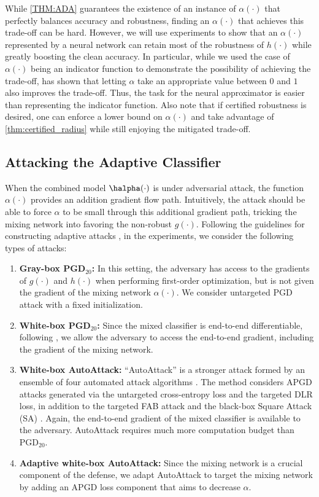 \documentclass[11pt, letterpaper]{article}
\theoremstyle{plain}
\theoremstyle{definition}
\begin{document}
While \cref{THM:ADA} guarantees the existence of an instance of $\alpha (\cdot)$ that perfectly balances accuracy and robustness, finding an $\alpha (\cdot)$ that achieves this trade-off can be hard. However, we will use experiments to show that an $\alpha (\cdot)$ represented by a neural network can retain most of the robustness of $h (\cdot)$ while greatly boosting the clean accuracy. In particular, while we used the case of $\alpha (\cdot)$ being an indicator function to demonstrate the possibility of achieving the trade-off,  has shown that letting $\alpha$ take an appropriate value between $0$ and $1$ also improves the trade-off. Thus, the task for the neural approximator is easier than representing the indicator function. Also note that if certified robustness is desired, one can enforce a lower bound on $\alpha (\cdot)$ and take advantage of \cref{thm:certified_radius} while still enjoying the mitigated trade-off.


\subsection{Attacking the Adaptive Classifier} \label{sec:adaptive_attack}

When the combined model $\halpha (\cdot)$ is under adversarial attack, the function $\alpha (\cdot)$ provides an addition gradient flow path. Intuitively, the attack should be able to force $\alpha$ to be small through this additional gradient path, tricking the mixing network into favoring the non-robust $g (\cdot)$. Following the guidelines for constructing adaptive attacks \citep{Tramer20}, in the experiments, we consider the following types of attacks:
\begin{enumerate}[label=\textbf{\Alph*}, leftmargin=7.5mm]
\setlength\itemsep{1pt}
	\item \textbf{Gray-box PGD$_{20}$:} In this setting, the adversary has access to the gradients of $g (\cdot)$ and $h (\cdot)$ when performing first-order optimization, but is not given the gradient of the mixing network $\alpha (\cdot)$. We consider untargeted PGD attack with a fixed initialization.
	\item \textbf{White-box PGD$_{20}$:} Since the mixed classifier is end-to-end differentiable, following \citep{Tramer20}, we allow the adversary to access the end-to-end gradient, including the gradient of the mixing network.
	\item \textbf{White-box AutoAttack:} ``AutoAttack'' is a stronger attack formed by an ensemble of four automated attack algorithms \citep{Croce20a}. The method considers APGD attacks generated via the untargeted cross-entropy loss and the targeted DLR loss, in addition to the targeted FAB attack and the black-box Square Attack (SA) \citep{Andriushchenko20}. Again, the end-to-end gradient of the mixed classifier is available to the adversary. AutoAttack requires much more computation budget than PGD$_{20}$.
	\item \textbf{Adaptive white-box AutoAttack:} Since the mixing network is a crucial component of the defense, we adapt AutoAttack to target the mixing network by adding an APGD loss component that aims to decrease $\alpha$.
\end{enumerate}
\end{document}
